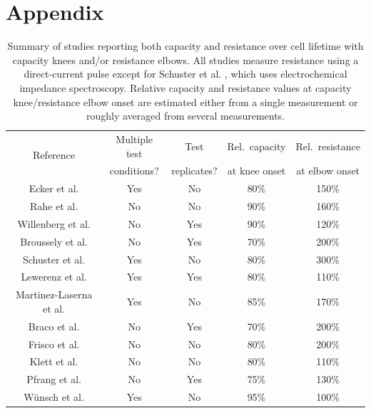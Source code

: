 \documentclass[journal=jpclcd,manuscript=article]{achemso}
\begin{document}
\newpage
% 


\appendix

\newpage
\section{Appendix}


\begin{table}[!ht]
    \centering
    \begin{tabular}{|c||c|c|c|c|}
        \hline
\multirow{2}{*}{Reference}
& Multiple test & Test        & Rel.~capacity & Rel.~resistance \\
& conditions?   & replicates? & at knee onset & at elbow onset \\
        \hline
        Ecker et al.\cite{ecker_calendar_2014} & Yes & No & 80\% & 150\% \\
        Rahe et al.\cite{rahe_nanoscale_2019} & No & No & 90\% & 160\% \\
        Willenberg et al.\cite{willenberg_development_2020} & No & Yes & 90\% & 120\% \\
        Broussely et al.\cite{broussely_main_2005} & No & Yes & 70\% & 200\% \\
        Schuster et al.\cite{schuster_nonlinear_2015} & Yes & No & 80\% & 300\% \\
        Lewerenz et al.\cite{lewerenz_systematic_2017, lewerenz_post-mortem_2017} & Yes & Yes & 80\% & 110\% \\
        Martinez-Laserna et al.\cite{martinez-laserna_technical_2018} & Yes & No &  85\% & 170\% \\
        Braco et al.\cite{braco_experimental_2020} & No & Yes & 70\% & 200\% \\
        Frisco et al.\cite{frisco_understanding_2016} & No & No & 80\% & 200\% \\
        Klett et al.\cite{klett_non-uniform_2014} & No & No & 80\% & 110\% \\
        Pfrang et al.\cite{pfrang_long-term_2018} & No & Yes & 75\% & 130\% \\
        Wünsch et al.\cite{wunsch_investigation_2019} & Yes & No & 95\% & 100\% \\
        \hline
    \end{tabular}
    \caption{Summary of studies reporting both capacity and resistance over cell lifetime with capacity knees and/or resistance elbows. All studies measure resistance using a direct-current pulse except for Schuster et al. \cite{schuster_nonlinear_2015}, which uses electrochemical impedance spectroscopy. Relative capacity and resistance values at capacity knee/resistance elbow onset are estimated either from a single measurement or roughly averaged from several measurements.}
    \label{tab:dcr_growth_papers}
\end{table}
\end{document}
